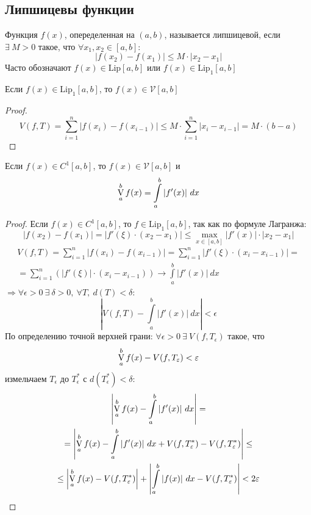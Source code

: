 \subsection{Липшицевы функции}
\begin{definition}
Функция $f(x)$, опеределенная на $(a,b)$, называется липшицевой, если $\exists\ M>0$ такое, что $\forall x_1,x_2\in [a,b]:$
\[|f(x_2)-f(x_1)|\leq M\cdot |x_2-x_1|\]
Часто обозначают $f(x)\in \text{Lip}[a,b]$ или $f(x)\in \text{Lip}_1[a,b]$
\end{definition} 
\begin{theorem}
    Если $f(x)\in \text{Lip}_1[a,b]$, то $f(x)\in \mathcal{V}[a,b]$
\end{theorem} 
\begin{proof}
    \[V(f,T)=\sum\limits_{i=1}^{n}|f(x_i)-f(x_{i-1})|\leq M\cdot\sum\limits_{i=1}^{n}|x_i-x_{i-1}|=M\cdot (b-a)\]
\end{proof} 
\begin{theorem}
    Если $f(x)\in C^1[a,b]$, то $f(x)\in \mathcal{V}[a,b]$ и 
    \[\operatorname*{V}\limits_{a}^{b} f(x)=\int\limits_{a}^{b}|f'(x)|\ dx\]
\end{theorem} 
\begin{proof}
    Если $f(x)\in C^1[a,b]$, то $f\in \text{Lip}_1[a,b]$, так как по формуле Лагранжа:
    \[|f(x_2)-f(x_1)|=|f'(\xi)\cdot (x_2-x_1)|\leq \max\limits_{x\in [a,b]}|f'(x)|\cdot|x_2-x_1|\]
    \begin{multline*}
        V(f, T)=\sum\limits_{i=1}^{n}|f(x_i)-f(x_{i-1})|=\sum\limits_{i=1}^{n} |f'(\xi)\cdot (x_i-x_{i-1})|=\\
        =\sum\limits_{i=1}^{n} (|f'(\xi)|\cdot (x_i-x_{i-1}))\to \int\limits_{a}^{b}|f'(x)|\ dx
    \end{multline*}
    $\Rightarrow \forall \epsilon>0\ \exists\ \delta>0,\ \forall T,\ d(T)<\delta$:
    \[\left|V(f,T)-\int\limits_{a}^{b}|f'(x)|\ dx\right|<\epsilon\]
    По определению точной верхней грани: $\forall \epsilon>0\ \exists\ V(f,T_{\epsilon})$ такое, что
    \[\operatorname*{V}\limits_{a}^{b} f(x)-V(f,T_{\varepsilon})<\varepsilon\]
    измельчаем $T_{\epsilon}$ до $T_{\epsilon}^*$ с $d(T_{\epsilon}^*)<\delta$:
    \begin{multline*}
        \left| \variation\limits_{a}^{b} f(x)-\int\limits_{a}^{b}|f'(x)|\ dx \right|=\\=\left|\variation\limits_{a}^{b} f(x)-\int\limits_{a}^{b}|f'(x)|\ dx+V(f,T_{\epsilon}^*)-V(f, T_{\epsilon}^*)\right|\leq\\
        \leq \left|\variation\limits_{a}^{b} f(x)-V(f, T_{\epsilon}^*)\right|+\left|\int\limits_{a}^{b}|f(x)|\ dx-V(f,T_{\epsilon}^*)\right|<2\epsilon
    \end{multline*}
\end{proof}
